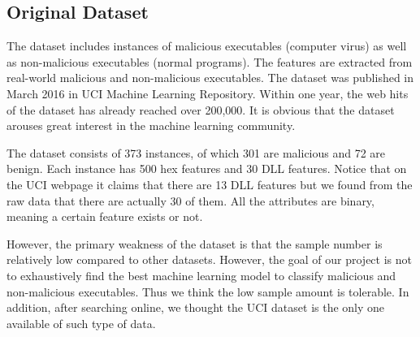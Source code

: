 \documentclass[11pt]{article}
\begin{document}
\subsection{Original Dataset}
The dataset includes instances of malicious executables (computer virus) as well as non-malicious executables (normal programs). The features are extracted from real-world malicious and non-malicious executables. The dataset was published in March 2016 in UCI Machine Learning Repository. Within one year, the web hits of the dataset has already reached over 200,000. It is obvious that the dataset arouses great interest in the machine learning community.

The dataset consists of 373 instances, of which 301 are malicious and 72 are benign. Each instance has 500 hex features and 30 DLL features. Notice that on the UCI webpage it claims that there are 13 DLL features but we found from the raw data that there are actually 30 of them. All the attributes are binary, meaning a certain feature exists or not.

However, the primary weakness of the dataset is that the sample number is relatively low compared to other datasets. However, the goal of our project is not to exhaustively find the best machine learning model to classify malicious and non-malicious executables. Thus we think the low sample amount is tolerable. In addition, after searching online, we thought the UCI dataset is the only one available of such type of data.

\end{document}
